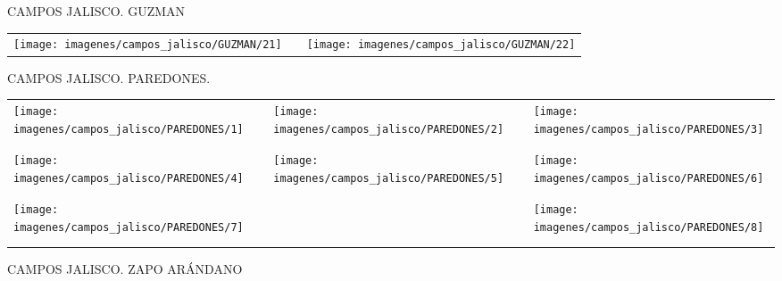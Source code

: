 \documentclass[10pt,letter]{report}
\begin{document}
\begin{center}
	\textcolor{principal}{CAMPOS JALISCO. GUZMAN}
\end{center}
\begin{table}[H]
\centering

\footnotesize
	\begin{tabular}{m{5cm}m{1cm}m{5cm}}
	
	\texttt{[image: imagenes/campos\_jalisco/GUZMAN/21]}&&\texttt{[image: imagenes/campos\_jalisco/GUZMAN/22]}	
	\end{tabular}
	
\end{table}
\newpage

\begin{center}
	\textcolor{principal}{CAMPOS JALISCO. PAREDONES.}
\end{center}
\begin{table}[H]
\centering

\footnotesize
	\begin{tabular}{m{5cm}m{1cm}m{5cm}m{1cm}m{5cm}}
	
	\texttt{[image: imagenes/campos\_jalisco/PAREDONES/1]}&&\texttt{[image: imagenes/campos\_jalisco/PAREDONES/2]}&&\texttt{[image: imagenes/campos\_jalisco/PAREDONES/3]}\\
	\\
	\\
	\texttt{[image: imagenes/campos\_jalisco/PAREDONES/4]}&&\texttt{[image: imagenes/campos\_jalisco/PAREDONES/5]}&&\texttt{[image: imagenes/campos\_jalisco/PAREDONES/6]}\\
	\\
	\\
	\texttt{[image: imagenes/campos\_jalisco/PAREDONES/7]}&&&&\texttt{[image: imagenes/campos\_jalisco/PAREDONES/8]}\\
	\\	
	\\
	
	\end{tabular}
	
\end{table}
\newpage
\begin{center}
	\textcolor{principal}{CAMPOS JALISCO. ZAPO AR\'ANDANO}
\end{center}
\end{document}
